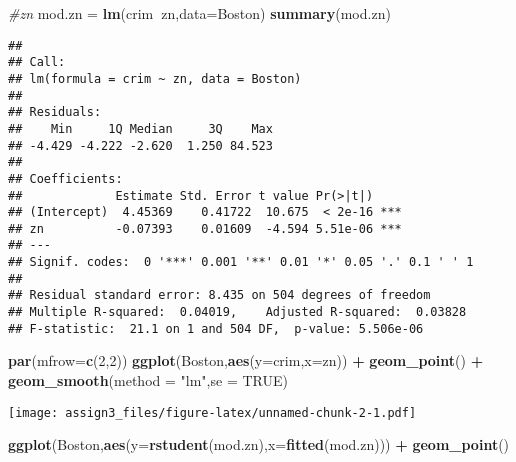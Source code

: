 \documentclass[]{article}
\newenvironment{Shaded}{\begin{snugshade}}{\end{snugshade}}
\newcommand{\CommentTok}[1]{\textcolor[rgb]{0.56,0.35,0.01}{\textit{#1}}}
\newcommand{\DataTypeTok}[1]{\textcolor[rgb]{0.13,0.29,0.53}{#1}}
\newcommand{\DecValTok}[1]{\textcolor[rgb]{0.00,0.00,0.81}{#1}}
\newcommand{\KeywordTok}[1]{\textcolor[rgb]{0.13,0.29,0.53}{\textbf{#1}}}
\newcommand{\NormalTok}[1]{#1}
\newcommand{\OperatorTok}[1]{\textcolor[rgb]{0.81,0.36,0.00}{\textbf{#1}}}
\newcommand{\OtherTok}[1]{\textcolor[rgb]{0.56,0.35,0.01}{#1}}
\newcommand{\StringTok}[1]{\textcolor[rgb]{0.31,0.60,0.02}{#1}}
\begin{document}
\begin{Shaded}
\begin{Highlighting}[]
\CommentTok{#zn}
\NormalTok{mod.zn =}\StringTok{ }\KeywordTok{lm}\NormalTok{(crim}\OperatorTok{~}\NormalTok{zn,}\DataTypeTok{data=}\NormalTok{Boston)}
\KeywordTok{summary}\NormalTok{(mod.zn)}
\end{Highlighting}
\end{Shaded}

\begin{verbatim}
## 
## Call:
## lm(formula = crim ~ zn, data = Boston)
## 
## Residuals:
##    Min     1Q Median     3Q    Max 
## -4.429 -4.222 -2.620  1.250 84.523 
## 
## Coefficients:
##             Estimate Std. Error t value Pr(>|t|)    
## (Intercept)  4.45369    0.41722  10.675  < 2e-16 ***
## zn          -0.07393    0.01609  -4.594 5.51e-06 ***
## ---
## Signif. codes:  0 '***' 0.001 '**' 0.01 '*' 0.05 '.' 0.1 ' ' 1
## 
## Residual standard error: 8.435 on 504 degrees of freedom
## Multiple R-squared:  0.04019,    Adjusted R-squared:  0.03828 
## F-statistic:  21.1 on 1 and 504 DF,  p-value: 5.506e-06
\end{verbatim}

\begin{Shaded}
\begin{Highlighting}[]
\KeywordTok{par}\NormalTok{(}\DataTypeTok{mfrow=}\KeywordTok{c}\NormalTok{(}\DecValTok{2}\NormalTok{,}\DecValTok{2}\NormalTok{))}
\KeywordTok{ggplot}\NormalTok{(Boston,}\KeywordTok{aes}\NormalTok{(}\DataTypeTok{y=}\NormalTok{crim,}\DataTypeTok{x=}\NormalTok{zn)) }\OperatorTok{+}\StringTok{ }\KeywordTok{geom_point}\NormalTok{() }\OperatorTok{+}\StringTok{ }\KeywordTok{geom_smooth}\NormalTok{(}\DataTypeTok{method =} \StringTok{"lm"}\NormalTok{,}\DataTypeTok{se =} \OtherTok{TRUE}\NormalTok{)}
\end{Highlighting}
\end{Shaded}

\texttt{[image: assign3\_files/figure-latex/unnamed-chunk-2-1.pdf]}

\begin{Shaded}
\begin{Highlighting}[]
\KeywordTok{ggplot}\NormalTok{(Boston,}\KeywordTok{aes}\NormalTok{(}\DataTypeTok{y=}\KeywordTok{rstudent}\NormalTok{(mod.zn),}\DataTypeTok{x=}\KeywordTok{fitted}\NormalTok{(mod.zn))) }\OperatorTok{+}\StringTok{ }\KeywordTok{geom_point}\NormalTok{() }
\end{Highlighting}
\end{Shaded}
\end{document}
